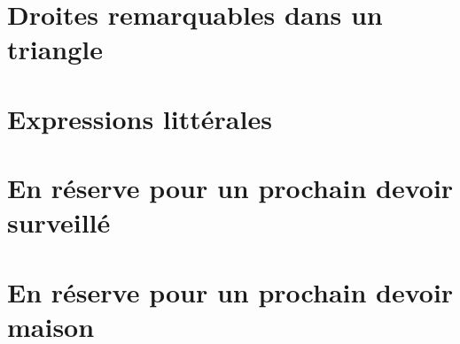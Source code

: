 

\section{Droites remarquables dans un triangle}


\section{Expressions littérales}


\section{En réserve pour un prochain devoir surveillé}



\section{En réserve pour un prochain devoir maison}



